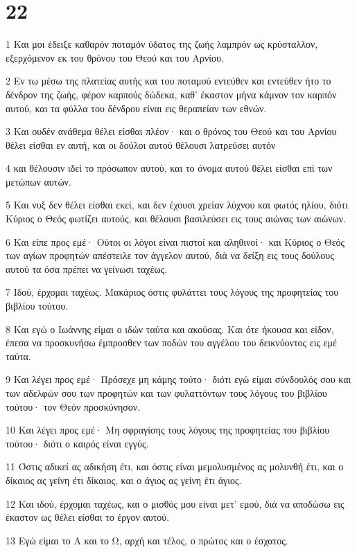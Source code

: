\chapter{22}

\par 1 Και μοι έδειξε καθαρόν ποταμόν ύδατος της ζωής λαμπρόν ως κρύσταλλον, εξερχόμενον εκ του θρόνου του Θεού και του Αρνίου.
\par 2 Εν τω μέσω της πλατείας αυτής και του ποταμού εντεύθεν και εντεύθεν ήτο το δένδρον της ζωής, φέρον καρπούς δώδεκα, καθ' έκαστον μήνα κάμνον τον καρπόν αυτού, και τα φύλλα του δένδρου είναι εις θεραπείαν των εθνών.
\par 3 Και ουδέν ανάθεμα θέλει είσθαι πλέον· και ο θρόνος του Θεού και του Αρνίου θέλει είσθαι εν αυτή, και οι δούλοι αυτού θέλουσι λατρεύσει αυτόν
\par 4 και θέλουσιν ιδεί το πρόσωπον αυτού, και το όνομα αυτού θέλει είσθαι επί των μετώπων αυτών.
\par 5 Και νυξ δεν θέλει είσθαι εκεί, και δεν έχουσι χρείαν λύχνου και φωτός ηλίου, διότι Κύριος ο Θεός φωτίζει αυτούς, και θέλουσι βασιλεύσει εις τους αιώνας των αιώνων.
\par 6 Και είπε προς εμέ· Ούτοι οι λόγοι είναι πιστοί και αληθινοί· και Κύριος ο Θεός των αγίων προφητών απέστειλε τον άγγελον αυτού, διά να δείξη εις τους δούλους αυτού τα όσα πρέπει να γείνωσι ταχέως.
\par 7 Ιδού, έρχομαι ταχέως. Μακάριος όστις φυλάττει τους λόγους της προφητείας του βιβλίου τούτου.
\par 8 Και εγώ ο Ιωάννης είμαι ο ιδών ταύτα και ακούσας. Και ότε ήκουσα και είδον, έπεσα να προσκυνήσω έμπροσθεν των ποδών του αγγέλου του δεικνύοντος εις εμέ ταύτα.
\par 9 Και λέγει προς εμέ· Πρόσεχε μη κάμης τούτο· διότι εγώ είμαι σύνδουλός σου και των αδελφών σου των προφητών και των φυλαττόντων τους λόγους του βιβλίου τούτου· τον Θεόν προσκύνησον.
\par 10 Και λέγει προς εμέ· Μη σφραγίσης τους λόγους της προφητείας του βιβλίου τούτου· διότι ο καιρός είναι εγγύς.
\par 11 Όστις αδικεί ας αδικήση έτι, και όστις είναι μεμολυσμένος ας μολυνθή έτι, και ο δίκαιος ας γείνη έτι δίκαιος, και ο άγιος ας γείνη έτι άγιος.
\par 12 Και ιδού, έρχομαι ταχέως, και ο μισθός μου είναι μετ' εμού, διά να αποδώσω εις έκαστον ως θέλει είσθαι το έργον αυτού.
\par 13 Εγώ είμαι το Α και το Ω, αρχή και τέλος, ο πρώτος και ο έσχατος.
